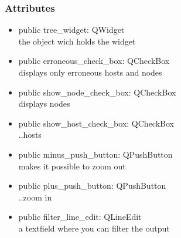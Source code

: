 \subsubsection{Attributes}
\begin{itemize}
  \item public tree\_widget: QWidget\\
  the object wich holds the widget
  \item public erroneous\_check\_box: QCheckBox\\
  displays only erroneous hosts and nodes
  \item public show\_node\_check\_box: QCheckBox\\
  displays nodes
  \item public show\_host\_check\_box: QCheckBox\\
  ..hosts
  \item public minus\_push\_button: QPushButton\\
  makes it possible to zoom out
  \item public plus\_push\_button: QPushButton\\
  ..zoom in
  \item public filter\_line\_edit: QLineEdit\\
  a textfield where you can filter the output
\end{itemize}

